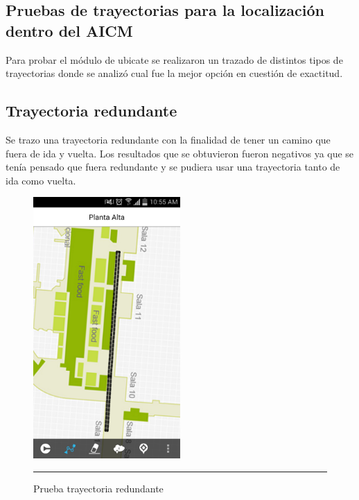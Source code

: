 \subsection{Pruebas de trayectorias para la localización dentro del AICM}
Para probar el módulo de ubicate se realizaron un trazado de distintos tipos de trayectorias donde se analizó cual fue la mejor 
opción en cuestión de exactitud. 

\subsection{Trayectoria redundante}
Se trazo una trayectoria redundante con la finalidad de tener un camino que fuera de ida y vuelta. Los resultados que se obtuvieron 
fueron negativos ya que se tenía pensado que fuera redundante y se pudiera usar una trayectoria tanto de ida como vuelta.

\begin{figure}[h]
	\centering
		\includegraphics[width=0.5\textwidth]{Figuras/redundante.png}
		\rule{30em}{0.5pt}
	\caption[Prueba trayectoria redundante]{Prueba trayectoria redundante}
	\label{fig:vistaPruebaRedundante}
\end{figure}
\clearpage

